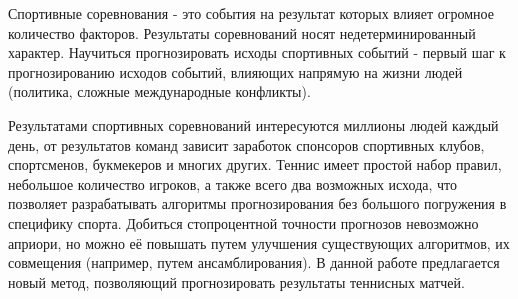 \Introduction



Спортивные соревнования - это события на результат которых влияет огромное количество факторов. Результаты соревнований носят недетерминированный характер. Научиться прогнозировать исходы спортивных событий - первый шаг к прогнозированию исходов событий, влияющих напрямую на жизни людей (политика, сложные международные конфликты).

Результатами спортивных соревнований интересуются миллионы людей каждый день, от результатов команд зависит заработок спонсоров спортивных клубов, спортсменов, букмекеров и многих других.  Теннис имеет простой набор правил, небольшое количество игроков,  а также всего два возможных исхода, что позволяет разрабатывать алгоритмы прогнозирования без большого погружения 
в специфику спорта.
Добиться стопроцентной точности прогнозов невозможно априори, но можно её повышать путем улучшения существующих алгоритмов, их совмещения (например, путем ансамблирования). 
В данной работе предлагается новый метод, позволяющий прогнозировать результаты теннисных матчей.
                                                                                                                                                                                                                                                                                                                    

